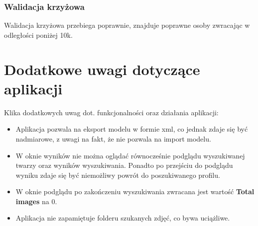 \documentclass[]{article}
\begin{document}
\subsubsection{Walidacja krzyżowa}
Walidacja krzyżowa przebiega poprawnie, znajduje poprawne osoby zwracając w odległości poniżej 10k.

\section[Wnioski]{Dodatkowe uwagi dotyczące aplikacji}
\label{sec:more}
Klika dodatkowych uwag dot. funkcjonalności oraz działania aplikacji:
\begin{itemize}
\item Aplikacja pozwala na eksport modelu w formie xml, co jednak zdaje się być nadmiarowe, z uwagi na fakt, że nie pozwala na import modelu.
\item W oknie wyników nie można oglądać równocześnie podglądu wyszukiwanej twarzy oraz wyników wyszukiwania. Ponadto po przejściu do podglądu wyniku zdaje się być niemożliwy powrót do poszukiwanego profilu.
\item W oknie podglądu po zakończeniu wyszukiwania zwracana jest wartość \textbf{Total images} na 0.
\item Aplikacja nie zapamiętuje folderu szukanych zdjęć, co bywa uciążliwe.
\end{itemize}


\newpage
\tableofcontents
\end{document}
